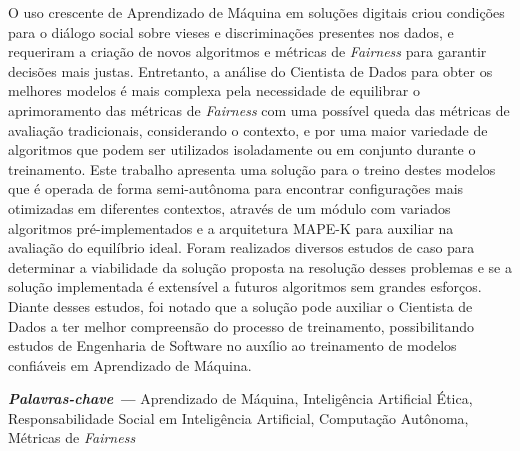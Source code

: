 \documentclass[Portugues,Final]{ic-tese-v3}
\providecommand{\palavraschave}[1]
{
  \small	
  \textbf{\textit{Palavras-chave ---}} #1
}
\begin{document}
\begin{resumo}
O uso crescente de Aprendizado de Máquina em soluções digitais criou condições para o diálogo social sobre vieses e discriminações presentes nos dados, e requeriram a criação de novos algoritmos e métricas de \textit{Fairness} para garantir decisões mais justas. Entretanto, a análise do Cientista de Dados para obter os melhores modelos é mais complexa pela necessidade de equilibrar o aprimoramento das métricas de \textit{Fairness} com uma possível queda das métricas de avaliação tradicionais, considerando o contexto, e por uma maior variedade de algoritmos que podem ser utilizados isoladamente ou em conjunto durante o treinamento. Este trabalho apresenta uma solução para o treino destes modelos que é operada de forma semi-autônoma para encontrar configurações mais otimizadas em diferentes contextos, através de um módulo com variados algoritmos pré-implementados e a arquitetura MAPE-K para auxiliar na avaliação do equilíbrio ideal. Foram realizados diversos estudos de caso para determinar a viabilidade da solução proposta na resolução desses problemas e se a solução implementada é extensível a futuros algoritmos sem grandes esforços. Diante desses estudos, foi notado que a solução pode auxiliar o Cientista de Dados a ter melhor compreensão do processo de treinamento, possibilitando estudos de Engenharia de Software no auxílio ao treinamento de modelos confiáveis em Aprendizado de Máquina.

\palavraschave{Aprendizado de Máquina, Inteligência Artificial Ética, Responsabilidade Social em Inteligência Artificial, Computação Autônoma, Métricas de \textit{Fairness}}
\end{resumo}
\end{document}
